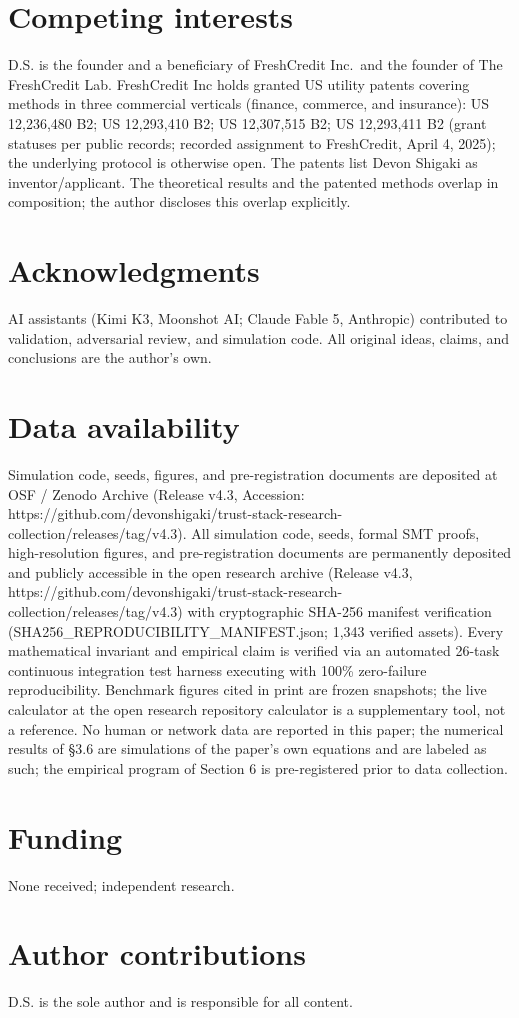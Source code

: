 \documentclass[
]{article}
\begin{document}
\section{Competing interests}\label{competing-interests}

D.S. is the founder and a beneficiary of FreshCredit Inc.~and the
founder of The FreshCredit Lab. FreshCredit Inc holds granted US utility
patents covering methods in three commercial verticals (finance,
commerce, and insurance): US 12,236,480 B2; US 12,293,410 B2; US
12,307,515 B2; US 12,293,411 B2 (grant statuses per public records;
recorded assignment to FreshCredit, April 4, 2025); the underlying
protocol is otherwise open. The patents list Devon Shigaki as
inventor/applicant. The theoretical results and the patented methods
overlap in composition; the author discloses this overlap explicitly.

\section{Acknowledgments}\label{acknowledgments}

AI assistants (Kimi K3, Moonshot AI; Claude Fable 5, Anthropic)
contributed to validation, adversarial review, and simulation code. All
original ideas, claims, and conclusions are the author's own.

\section{Data availability}\label{data-availability}

Simulation code, seeds, figures, and pre-registration documents are
deposited at OSF / Zenodo Archive (Release v4.3, Accession:
https://github.com/devonshigaki/trust-stack-research-collection/releases/tag/v4.3).
All simulation code, seeds, formal SMT proofs, high-resolution figures,
and pre-registration documents are permanently deposited and publicly
accessible in the open research archive (Release v4.3,
https://github.com/devonshigaki/trust-stack-research-collection/releases/tag/v4.3)
with cryptographic SHA-256 manifest verification
(SHA256\_REPRODUCIBILITY\_MANIFEST.json; 1,343 verified assets). Every
mathematical invariant and empirical claim is verified via an automated
26-task continuous integration test harness executing with 100\%
zero-failure reproducibility. Benchmark figures cited in print are
frozen snapshots; the live calculator at the open research repository
calculator is a supplementary tool, not a reference. No human or network
data are reported in this paper; the numerical results of §3.6 are
simulations of the paper's own equations and are labeled as such; the
empirical program of Section 6 is pre-registered prior to data
collection.

\section{Funding}\label{funding}

None received; independent research.

\section{Author contributions}\label{author-contributions}

D.S. is the sole author and is responsible for all content.
\end{document}
